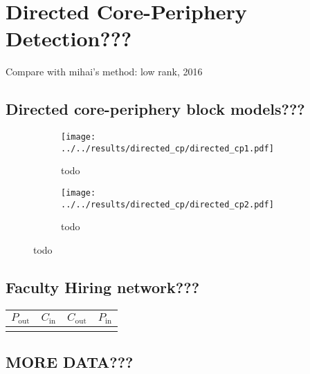 \chapter{Directed Core-Periphery Detection???}

Compare with mihai's method: low rank, 2016

\section{Directed core-periphery block models???}



\begin{figure}[H]
	\begin{subfigure}{.5\textwidth}
		\centering
		\texttt{[image: ../../results/directed\_cp/directed\_cp1.pdf]}
		\caption{todo}
		\label{fig:todo} 
	\end{subfigure}
	\begin{subfigure}{.5\textwidth}
		\centering
		\texttt{[image: ../../results/directed\_cp/directed\_cp2.pdf]}
		\caption{todo}
		\label{fig:todo} 
	\end{subfigure}
\end{figure}




\section{Faculty Hiring network???}



\begin{center}
\tiny
\begin{tabular}{ |c|c|c|c| }

	\hline
	
	\rule{0pt}{1.5em}
	\normalsize $P_\mathrm{out}$ &
	\normalsize $C_\mathrm{in}$  &
	\normalsize $C_\mathrm{out}$ &
	\normalsize $P_\mathrm{in}$ \\[0.1cm]
	
	\hline
	
	\rule{0pt}{1.2em}
	 \\[0.1cm]
	
	\hline
	
\end{tabular}
\end{center}


\section{MORE DATA???}